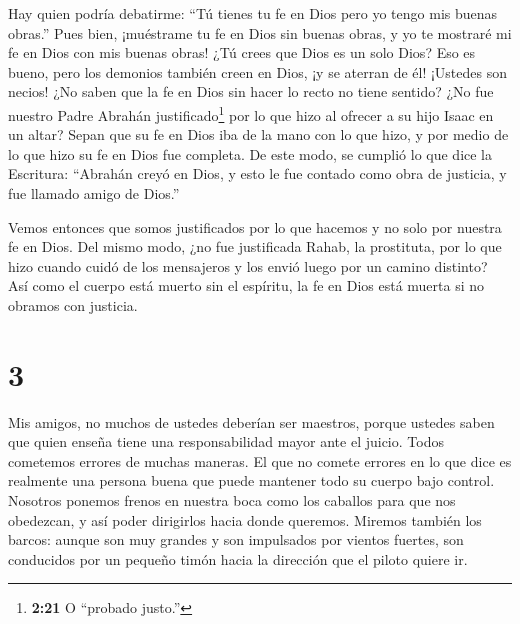  Hay quien podría debatirme: ``Tú tienes tu fe en Dios pero
yo tengo mis buenas obras.'' Pues bien, ¡muéstrame tu fe en Dios sin
buenas obras, y yo te mostraré mi fe en Dios con mis buenas obras!
 ¿Tú crees que Dios es un solo Dios? Eso es bueno, pero los
demonios también creen en Dios, ¡y se aterran de él! 
¡Ustedes son necios! ¿No saben que la fe en Dios sin hacer lo recto no
tiene sentido?  ¿No fue nuestro Padre Abrahán
justificado\footnote{\textbf{2:21} O ``probado justo.''} por lo que hizo
al ofrecer a su hijo Isaac en un altar?  Sepan que su fe en
Dios iba de la mano con lo que hizo, y por medio de lo que hizo su fe en
Dios fue completa.  De este modo, se cumplió lo que dice la
Escritura: ``Abrahán creyó en Dios, y esto le fue contado como obra de
justicia, y fue llamado amigo de Dios.''

 Vemos entonces que somos justificados por lo que hacemos y
no solo por nuestra fe en Dios.  Del mismo modo, ¿no fue
justificada Rahab, la prostituta, por lo que hizo cuando cuidó de los
mensajeros y los envió luego por un camino distinto?  Así
como el cuerpo está muerto sin el espíritu, la fe en Dios está muerta si
no obramos con justicia.

\hypertarget{section-2}{%
\section{3}\label{section-2}}

 Mis amigos, no muchos de ustedes deberían ser maestros,
porque ustedes saben que quien enseña tiene una responsabilidad mayor
ante el juicio.  Todos cometemos errores de muchas maneras.
El que no comete errores en lo que dice es realmente una persona buena
que puede mantener todo su cuerpo bajo control.  Nosotros
ponemos frenos en nuestra boca como los caballos para que nos obedezcan,
y así poder dirigirlos hacia donde queremos.  Miremos
también los barcos: aunque son muy grandes y son impulsados por vientos
fuertes, son conducidos por un pequeño timón hacia la dirección que el
piloto quiere ir.

